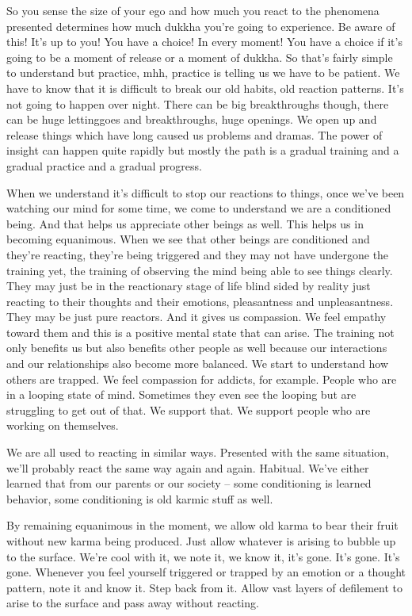 \documentclass[letterpaper,10pt,english]{sphinxmanual}
\begin{document}
\sphinxAtStartPar
So you sense the size of your ego and how much you react to the phenomena presented determines how much dukkha you’re going to experience.
Be aware of this! It’s up to you! You have a choice! In every moment! You
have a choice if it’s going to be a moment of release or a moment of dukkha.
So that’s fairly simple to understand but practice, mhh, practice is telling us we have to be patient. We have to know that it is difficult to break
our  old  habits,  old  reaction  patterns.  It’s  not  going  to  happen  over  night.
There can be big breakthroughs though, there can be huge letting\sphinxhyphen{}goes and
breakthroughs, huge openings. We open up and release things which have
long caused us problems and dramas. The power of insight can happen quite
rapidly but mostly the path is a gradual training and a gradual practice and
a gradual progress.

\sphinxAtStartPar
When we understand it’s difficult to stop our reactions to things, once
we’ve been watching our mind for some time, we come to understand we are
a conditioned being. And that helps us appreciate other beings as well. This
helps us in becoming equanimous. When we see that other beings are conditioned and they’re reacting, they’re being triggered and they may not have
undergone  the  training  yet,  the  training  of  observing  the  mind  being  able
to see things clearly. They may just be in the reactionary stage of life blind
  sided by reality just reacting to their thoughts and their emotions, pleasantness  and  unpleasantness.  They  may  be  just  pure  reactors. And  it  gives  us
compassion. We feel empathy toward them and this is a positive mental state
that can arise. The training not only benefits us but also benefits other people
as  well  because  our  interactions  and  our  relationships  also  become  more
balanced. We start to understand how others are trapped. We feel compassion  for  addicts,  for  example.  People  who  are  in  a  looping  state  of  mind.
Sometimes they even see the looping but are struggling to get out of that. We
support that. We support people who are working on themselves.

\sphinxAtStartPar
We are all used to reacting in similar ways. Presented with the same situation, we’ll probably react the same way again and again. Habitual. We’ve
either learned that from our parents or our society – some conditioning is
learned behavior, some conditioning is old karmic stuff as well.

\sphinxAtStartPar
By remaining equanimous in the moment, we allow old karma to bear
their fruit without new karma being produced. Just allow whatever is arising
to bubble up to the surface. We’re cool with it, we note it, we know it, it’s
gone. It’s gone. It’s gone. Whenever you feel yourself triggered or trapped
by an emotion or a thought pattern, note it and know it. Step back from it.
Allow vast layers of defilement to arise to the surface and pass away without
reacting.
\end{document}
